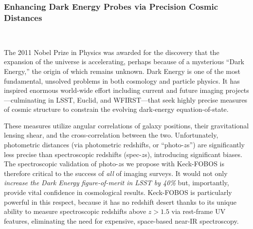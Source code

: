 \documentclass[oneside,11pt]{amsart}
\newcommand{\comment}[2][todo]{{\color{#1}[[{\bf #2}]]}}
\begin{document}
\subsubsection{Enhancing Dark Energy Probes via Precision Cosmic Distances}
\label{sec:cosmology}
~\medskip

The 2011 Nobel Prize in Physics was awarded for the discovery that the
expansion of the universe is accelerating, perhaps because of a
mysterious ``Dark Energy,'' the origin of which remains unknown.  Dark
Energy is one of the most fundamental, unsolved problems in both
cosmology and particle physics.  It has inspired enormous world-wide
effort including current and future imaging projects---culminating in
LSST, Euclid, and WFIRST---that seek highly precise measures of cosmic
structure to constrain the evolving dark-energy equation-of-state.

These measures utilize angular correlations of galaxy positions, their
gravitational lensing shear, and the cross-correlation between the two.
Unfortunately, photometric distances (via photometric redshifts, or
``photo-$z$s'') are significantly less precise than spectroscopic
redshifts (spec-$z$s), introducing significant biases.  The
spectroscopic validation of photo-$z$s we propose with Keck-FOBOS is
therefore critical to the success of {\it all} of imaging surveys. It
would not only \emph{increase the Dark Energy figure-of-merit in LSST by
40\%} \citep{newman15} but, importantly, provide vital confidence in
cosmological results. Keck-FOBOS is particularly powerful in this
respect, because it has no redshift desert thanks to its unique ability
to measure spectroscopic redshifts above $z > 1.5$ via rest-frame UV
features, eliminating the need for expensive, space-based near-IR
spectroscopy.

\end{document}
